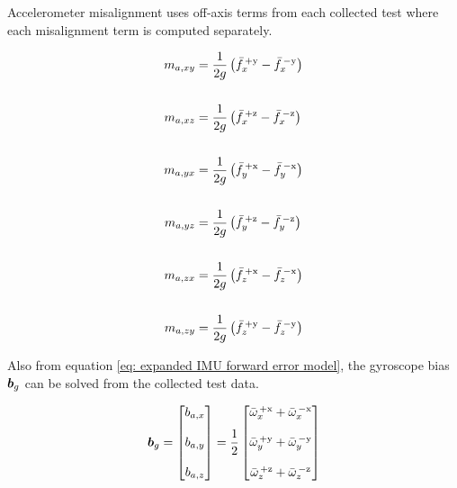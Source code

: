 Accelerometer misalignment uses off-axis terms from each collected test where each misalignment term is computed separately.

\begin{align} \label{eq: traditional accel misalignment computation}
	m_{a,xy} &= \frac{1}{2g} \left( \bar{f}^{\,+\textrm{y}}_{x} - \bar{f}^{\,-\textrm{y}}_{x} \right) \notag\\
	\notag\\
	m_{a,xz} &= \frac{1}{2g} \left( \bar{f}^{\,+\textrm{z}}_{x} - \bar{f}^{\,-\textrm{z}}_{x} \right) \notag\\
	\notag\\
	m_{a,yx} &= \frac{1}{2g} \left( \bar{f}^{\,+\textrm{x}}_{y} - \bar{f}^{\,-\textrm{x}}_{y} \right) \notag\\
	\\
	m_{a,yz} &= \frac{1}{2g} \left( \bar{f}^{\,+\textrm{z}}_{y} - \bar{f}^{\,-\textrm{z}}_{y} \right) \notag\\
	\notag\\
	m_{a,zx} &= \frac{1}{2g} \left( \bar{f}^{\,+\textrm{x}}_{z} - \bar{f}^{\,-\textrm{x}}_{z} \right) \notag\\
	\notag\\
	m_{a,zy} &= \frac{1}{2g} \left( \bar{f}^{\,+\textrm{y}}_{z} - \bar{f}^{\,-\textrm{y}}_{z} \right) \notag
\end{align}

Also from equation \ref{eq: expanded IMU forward error model}, the gyroscope bias $\boldsymbol{b}_g$ can be solved from the collected test data.

\begin{align} \label{eq: traditional gyro bias computation}
	\boldsymbol{b}_g = \begin{bmatrix} b_{a,x} \\ \\ b_{a,y} \\ \\ b_{a,z} \end{bmatrix} = \frac{1}{2} \begin{bmatrix}
		\bar{\omega}^{\,+\textrm{x}}_{x} + \bar{\omega}^{\,-\textrm{x}}_{x} \\
		\\
		\bar{\omega}^{\,+\textrm{y}}_{y} + \bar{\omega}^{\,-\textrm{y}}_{y} \\
		\\
		\bar{\omega}^{\,+\textrm{z}}_{z} + \bar{\omega}^{\,-\textrm{z}}_{z}
	\end{bmatrix}
\end{align}

